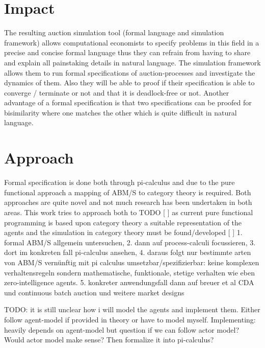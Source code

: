 \documentclass{article}
\begin{document}

\section{Impact}
The resulting auction simulation tool (formal language and simulation framework) allows computational economists to specify problems in this field in a precise and concise formal language thus they can refrain from having to share and explain all painstaking details in natural language. The simulation framework allows them to run formal specifications of auction-processes and investigate the dynamics of them. Also they will be able to proof if their specification is able to converge / terminate or not and that it is deadlock-free or not.
Another advantage of a formal specification is that two specifications can be proofed for bisimilarity where one matches the other which is quite difficult in natural language.



\section{Approach}
Formal specification is done both through pi-calculus and due to the pure functional approach a mapping of ABM/S to category theory is required. Both approaches are quite novel and not much research has been undertaken in both areas. This work tries to approach both to  TODO
[ ] as current pure functional programming is based upon category theory a suitable representation of the agents and the simulation in category theory must be found/developed
[ ] 1. formal ABM/S allgemein untersuchen, 2. dann auf process-calculi focussieren, 3. dort im konkreten fall pi-calculus ansehen, 4. daraus folgt nur bestimmte arten von ABM/S vernünftig mit pi calculus umsetzbar/spezifizierbar: keine komplexen verhaltensregeln sondern mathematische, funktionale, stetige verhalten wie eben zero-intelligence agents. 5. konkreter anwendungsfall dann auf breuer et al CDA und continuous batch auction und weitere market designs

TODO: it is still unclear how i will model the agents and implement them. Either follow agent-model if provided in theory or have to model myself. Implementing: heavily depends on agent-model but question if we can follow actor model? Would actor model make sense? Then formalize it into pi-calculus?
\end{document}
